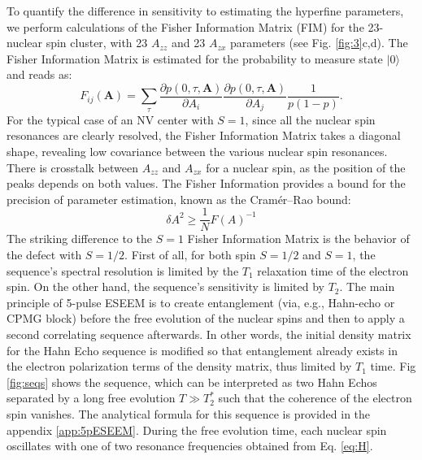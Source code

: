 \documentclass[%
 reprint,
superscriptaddress,
 amsmath,amssymb,
 aps,
]{revtex4-2}
\begin{document}
To quantify the difference in sensitivity to estimating the hyperfine parameters, we perform calculations of the Fisher Information Matrix (FIM) for the 23-nuclear spin cluster, with 23 $A_{zz}$ and 23 $A_{zx}$ parameters (see Fig. \ref{fig:3}c,d).
The Fisher Information Matrix is estimated for the probability to measure state $|0\rangle$ and reads as: 
\begin{equation}
	F_{ij}(\textbf{A})=\sum_\tau \frac{\partial p(0, \tau, \textbf{A})}{\partial A_i}\frac{\partial p(0, \tau, \textbf{A})}{ \partial A_j} \frac{1}{p (1-p)}.
\end{equation}
For the typical case of an NV center with $S=1$, since all the nuclear spin resonances are clearly resolved, the Fisher Information Matrix takes a diagonal shape, revealing low covariance between the various nuclear spin resonances.
There is crosstalk between $A_{zz}$ and $A_{zx}$ for a nuclear spin, as the position of the peaks depends on both values.
The Fisher Information provides a bound for the precision of parameter estimation, known as the Cramér–Rao bound: 
\begin{equation}
	\delta A^2 \ge \frac{1}{N} F(A)^{-1}
\end{equation}
The striking difference to the $S=1$ Fisher Information Matrix is the behavior of the defect with $S=1/2$.
First of all, for both spin $S=1/2$ and $S=1$, the sequence's spectral resolution is limited by the $T_1$ relaxation time of the electron spin.
On the other hand, the sequence's sensitivity is limited by $T_2$.
The main principle of 5-pulse ESEEM \cite{kasumaj20085} is to create entanglement (via, e.g., Hahn-echo or CPMG block) before the free evolution of the nuclear spins and then to apply a second correlating sequence afterwards.
In other words, the initial density matrix for the Hahn Echo sequence is modified so that entanglement already exists in the electron polarization terms of the density matrix, thus limited by $T_1$ time.
Fig \ref{fig:seqs} shows the sequence, which can be interpreted as two Hahn Echos separated by a long free evolution $T\gg T_2^\ast$ such that the coherence of the electron spin vanishes. The analytical formula for this sequence is provided in the appendix \ref{app:5pESEEM}.
During the free evolution time, each nuclear spin oscillates with one of two resonance frequencies obtained from Eq. \ref{eq:H}.
\end{document}
